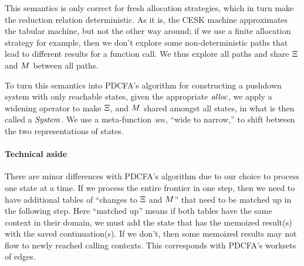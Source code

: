 This semantics is only correct for fresh allocation strategies, which in turn make the reduction relation deterministic.
%
As it is, the CESK machine approximates the tabular machine, but not the other way around;
%
if we use a finite allocation strategy for example, then we don't explore some non-deterministic paths that lead to different results for a function call.
%
We thus explore all paths and share $\Xi$ and $M$ between all paths.

To turn this semantics into PDCFA's algorithm for constructing a pushdown system with only reachable states, given the appropriate $\mathit{alloc}$, we apply a widening operator to make $\Xi$, and $M$ shared amongst all states, in what is then called a $\mathit{System}$. We use a meta-function $\mathit{wn}$, ``wide to narrow,'' to shift between the two representations of states.

\paragraph{Technical aside} There are minor differences with PDCFA's algorithm due to our choice to process one state at a time. If we process the entire frontier in one step, then we need to have additional tables of ``changes to $\Xi$ and $M$'' that need to be matched up in the following step. Here ``matched up'' means if both tables have the same context in their domain, we must add the state that has the memoized result(s) with the saved continuation(s). If we don't, then some memoized results may not flow to newly reached calling contexts. This corresponds with PDCFA's worksets of edges.
%

